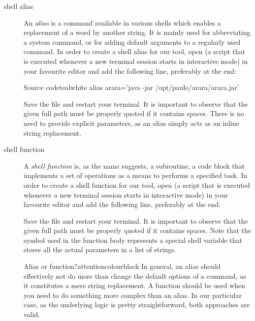 \begin{description}
\item[shell alias] An \emph{alias} is a command available in various shells which enables a replacement of a word by another string. It is mainly used for abbreviating a system command, or for adding default arguments to a regularly used command. In order to create a shell alias for our tool, open  (a script that is executed whenever a new terminal session starts in interactive mode) in your favourite editor and add the following line, preferably at the end:

\begin{codebox}{Source code}{teal}{\icnote}{white}
alias arara='java -jar /opt/paulo/arara/arara.jar'
\end{codebox}

Save the file and restart your terminal. It is important to observe that the given full path must be properly quoted if it contains spaces. There is no need to provide explicit parameters, as an alias simply acts as an inline string replacement.

\item[shell function] A \emph{shell function} is, as the name suggests, a subroutine, a code block that implements a set of operations as a means to performs a specified task. In order to create a shell function for our tool, open  (a script that is executed whenever a new terminal session starts in interactive mode) in your favourite editor and add the following line, preferably at the end:


Save the file and restart your terminal. It is important to observe that the given full path must be properly quoted if it contains spaces. Note that the  symbol used in the function body represents a special shell variable that stores all the actual parameters in a list of strings.

\begin{messagebox}{Alias or function?}{attentioncolour}{\icattention}{black}
In general, an alias should effectively not do more than change the default options of a command, as it constitutes a mere string replacement. A function should be used when you need to do something more complex than an alias. In our particular case, as the underlying logic is pretty straightforward, both approaches are valid.
\end{messagebox}


\end{description}
